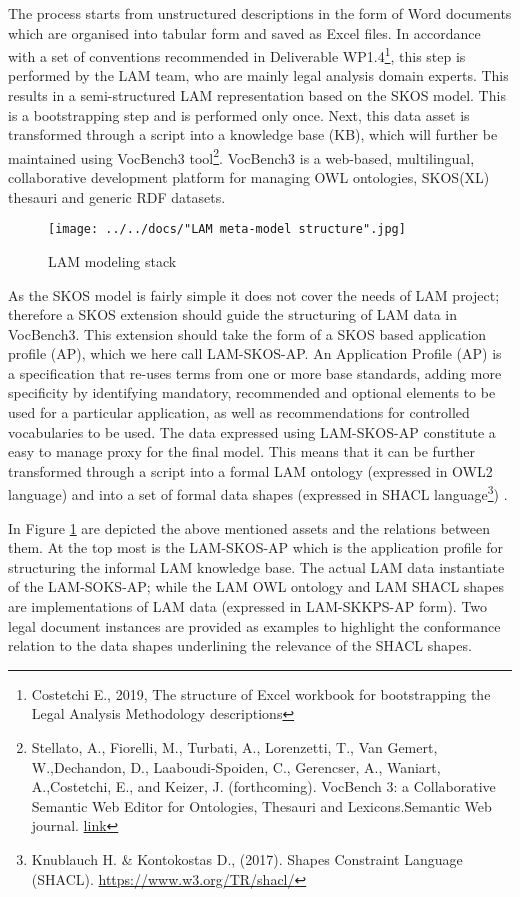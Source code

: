 The process starts from unstructured descriptions in the form of Word
documents which are organised into tabular form and saved as Excel
files. In accordance with a set of conventions recommended in Deliverable WP1.4\footnote{Costetchi E., 2019, The structure of Excel workbook for
	bootstrapping the Legal Analysis Methodology descriptions}, this step is performed by the LAM team, who are mainly legal analysis domain experts. 
This results in a semi-structured LAM representation based on the SKOS model. This is a bootstrapping step and is performed only once.
Next, this data asset is transformed through a script into a knowledge
base (KB), which will further be maintained using VocBench3
tool\footnote{Stellato, A., Fiorelli,
	M., Turbati, A., Lorenzetti, T., Van Gemert, W.,Dechandon, D., Laaboudi-Spoiden, C., Gerencser, A., Waniart, A.,Costetchi, E., and Keizer, J. (forthcoming). VocBench 3: a Collaborative Semantic Web Editor for Ontologies, Thesauri and Lexicons.Semantic Web journal. \href{http://www.semantic-web-journal.net/content/vocbench-3-collaborative-semantic-web-editor-ontologies-thesauri-and-lexicons-1}{link}}. VocBench3 is a
web-based, multilingual, collaborative development platform for managing
OWL ontologies, SKOS(XL) thesauri and generic RDF datasets.

\begin{figure}[!ht]
	\centering
	\texttt{[image: ../../docs/"LAM meta-model structure".jpg]}
	\caption{LAM modeling stack}
	\label{fig:meta-model}
\end{figure}

As the SKOS model is fairly simple it does not cover the needs of LAM
project; therefore a SKOS extension should guide the structuring of LAM
data in VocBench3. This extension should take the form of a SKOS based
application profile (AP), which we here call LAM-SKOS-AP. An Application
Profile (AP) is a specification that re-uses terms from one or more base
standards, adding more specificity by identifying mandatory, recommended
and optional elements to be used for a particular application, as well
as recommendations for controlled vocabularies to be used. The data
expressed using LAM-SKOS-AP constitute a easy to manage proxy for the
final model. This means that it can be further transformed through a
script into a formal LAM ontology (expressed in OWL2 language) and into
a set of formal data shapes (expressed in SHACL
language\footnote{Knublauch H. \& Kontokostas D., (2017). Shapes Constraint Language (SHACL). \url{https://www.w3.org/TR/shacl/}}) .

In Figure \ref{fig:meta-model} are depicted the above mentioned assets and the
relations between them. At the top most is the LAM-SKOS-AP which is the
application profile for structuring the informal LAM knowledge base. The
actual LAM data instantiate of the LAM-SOKS-AP; while the LAM OWL
ontology and LAM SHACL shapes are implementations of LAM data (expressed
in LAM-SKKPS-AP form). Two legal document instances are provided as
examples to highlight the conformance relation to the data shapes
underlining the relevance of the SHACL shapes.

